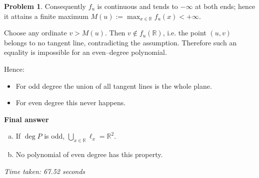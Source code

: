 \documentclass[12pt,a4paper]{article}
\theoremstyle{definition}
\newtheorem{problem}{Problem}
\begin{document}
\begin{problem}
        Consequently $f_u$ is continuous and tends to $-\infty$ at both ends; hence it attains a finite maximum $M(u) := \max_{x\in\mathbb{R}} f_u(x) < +\infty$.

        Choose any ordinate $v > M(u)$. Then $v \notin f_u(\mathbb{R})$, i.e. the point $(u , v)$ belongs to no tangent line, contradicting the assumption. Therefore such an equality is impossible for an even--degree polynomial.

        Hence:
        \begin{itemize}
            \item For odd degree the union of all tangent lines is the whole plane.
            \item For even degree this never happens.
        \end{itemize}

        \textbf{Final answer}
        \begin{enumerate}[(a)]
            \item If $\deg P$ is odd, $\bigcup_{x\in\mathbb{R}} \ell_x = \mathbb{R}^2$.
            \item No polynomial of even degree has this property.
        \end{enumerate}
    \end{problem}

    \textit{Time taken: 67.52 seconds}
\end{document}
